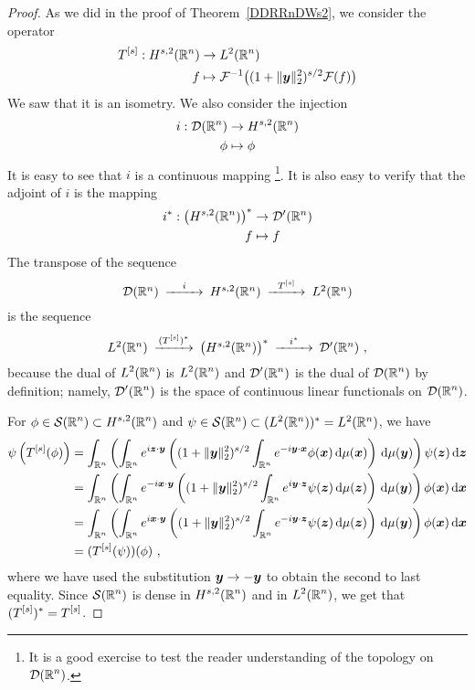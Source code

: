 \begin{proof}
As we did in the proof of Theorem~\ref{DDRRnDWs2}, we consider the operator
\begin{align*}
T^{[s]} : H^{s,2}(\mathbb{R}^n) & \to L^2(\mathbb{R}^n) \\
f &\mapsto \mathcal{F}^{-1}\big((1+\|{\bm{y}}\|_2^2)^{s/2} \mathcal{F}(f) \big)  
\end{align*}
We saw that it is an isometry.  We also consider the injection
\begin{align*}
i : \mathcal{D}(\mathbb{R}^n) & \to H^{s,2}(\mathbb{R}^n) \\
\phi &\mapsto \phi
\end{align*}
It is easy to see that $i$ is a continuous mapping \footnote{It is a
good exercise to test the reader understanding of the topology on
$\displaystyle \mathcal{D}(\mathbb{R}^n)$.}.
It is also easy to verify that the adjoint of $i$ is the mapping
\begin{align*}
i^\ast : \big(H^{s,2}(\mathbb{R}^n)\big)^\ast & \to \mathcal{D}'(\mathbb{R}^n) \\
f &\mapsto f
\end{align*}
The transpose of the sequence
\[
\begin{CD}
\DD(\RR^n) @>i>> H^{s,2}(\RR^n) @>T^{[s]}>> L^2(\RR^n)
\end{CD}
\]
is the sequence
\[
\begin{CD}
L^2(\RR^n) @>(T^{[s]})^\ast>> \big(H^{s,2}(\RR^n)\big)^\ast @>i^\ast>>
 \DD'(\RR^n)  \ ,
\end{CD}
\]
because the dual of $\displaystyle L^2(\mathbb{R}^n)$ is $\displaystyle L^2(\mathbb{R}^n)$
and $\displaystyle \mathcal{D}'(\mathbb{R}^n)$ is the dual of
$\displaystyle \mathcal{D}(\mathbb{R}^n)$ by definition; namely,
$\displaystyle \mathcal{D}'(\mathbb{R}^n)$ is the space of continuous linear
functionals on $\displaystyle \mathcal{D}(\mathbb{R}^n)$.

For $\displaystyle \phi \in \mathcal{S}(\mathbb{R}^n) \subset H^{s,2}(\mathbb{R}^n)$ and
$\psi \in \mathcal{S}(\mathbb{R}^n) \subset (L^2(\mathbb{R}^n))^\ast = L^2(\mathbb{R}^n)$, we have
\begin{align*}
\psi\left(T^{[s]}(\phi)\right)
&= \int_{\mathbb{R}^n}  \left( \int_{\mathbb{R}^n} e^{i{\bm{z}}\cdot {\bm{y}}} \left(
(1+\|{\bm{y}}\|_2^2)^{s/2} \int_{\mathbb{R}^n} e^{-i {\bm{y}}\cdot{\bm{x}}}
\phi({\bm{x}}) \,\mathrm{d}{\mu({\bm{x}})} \right) \,\mathrm{d}{\mu({\bm{y}})} \right)
\psi({\bm{z}}) \,\mathrm{d}{{\bm{z}}} \\
&= \int_{\mathbb{R}^n}  \left( \int_{\mathbb{R}^n} e^{-i{\bm{x}}\cdot {\bm{y}}} \left(
(1+\|{\bm{y}}\|_2^2)^{s/2} \int_{\mathbb{R}^n} e^{i {\bm{y}}\cdot{\bm{z}}}
\psi({\bm{z}}) \,\mathrm{d}{\mu({\bm{z}})} \right) \,\mathrm{d}{\mu({\bm{y}})} \right)
\phi({\bm{x}}) \,\mathrm{d}{{\bm{x}}} \\
&= \int_{\mathbb{R}^n}  \left( \int_{\mathbb{R}^n} e^{i{\bm{x}}\cdot {\bm{y}}} \left(
(1+\|{\bm{y}}\|_2^2)^{s/2} \int_{\mathbb{R}^n} e^{-i {\bm{y}}\cdot{\bm{z}}}
\psi({\bm{z}}) \,\mathrm{d}{\mu({\bm{z}})} \right) \,\mathrm{d}{\mu({\bm{y}})} \right)
\phi({\bm{x}}) \,\mathrm{d}{{\bm{x}}} \\
&= (T^{[s]}(\psi))(\phi) \ ,
\end{align*}
where we have used the substitution ${\bm{y}} \to -{\bm{y}}$ to obtain
the second to last equality.
Since $\displaystyle \mathcal{S}(\mathbb{R}^n)$ is dense in $\displaystyle H^{s,2}(\mathbb{R}^n)$ and
in $\displaystyle L^2(\mathbb{R}^n)$, we get that 
$\displaystyle (T^{[s]})^\ast = T^{[s]}$.


\end{proof}
